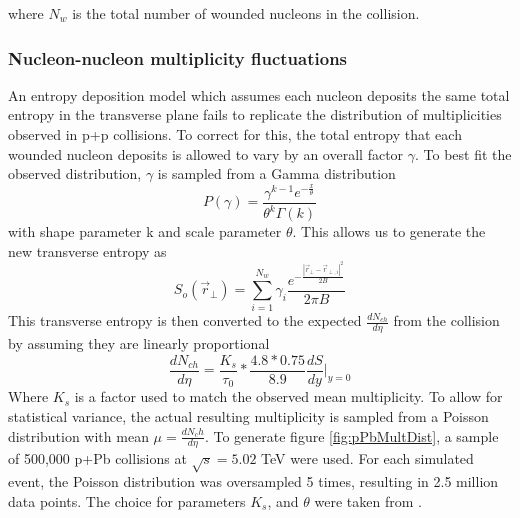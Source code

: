 \documentclass[preprint,showpacs,amsfonts,aps,prl,nofootinbib,floatfix]{revtex4}
\begin{document}
where $N_{w}$ is the total number of wounded nucleons in the collision. 

\subsubsection{Nucleon-nucleon multiplicity fluctuations}
\label{sec2a2}

An entropy deposition model which assumes each nucleon deposits the same total entropy in the transverse plane fails to replicate the distribution of multiplicities observed in p+p collisions. To correct for this, the total entropy that each wounded nucleon deposits is allowed to vary by an overall factor $\gamma$. To best fit the observed distribution, $\gamma$ is sampled from a Gamma distribution
\begin{equation} 
	P(\gamma) = \frac{\gamma^{k-1} e^{-\frac{x}{\theta}}}{\theta^k \Gamma(k)}
\end{equation}
with shape parameter k and scale parameter $\theta$. This allows us to generate the new transverse entropy as
\begin{equation} 
	S_{o}(\vec{r}_{\perp}) = \sum\limits_{i=1}^{N_{w}} \gamma_{i} \frac{e^{-\frac{|\vec{r}_{\perp}-\vec{r}_{\perp,i}|^2}{2B}}}{2\pi B}
\end{equation}
This transverse entropy is then converted to the expected $\frac{dN_{ch}}{d\eta}$ from the collision by assuming they are linearly proportional
\begin{equation}
	\frac{dN_{ch}}{d\eta} = \frac{K_{s}}{\tau_0} * \frac{4.8*0.75}{8.9} \frac{dS}{dy}\biggr\rvert_{y=0} 
\end{equation}
Where $K_s$ is a factor used to match the observed mean multiplicity. To allow for statistical variance, the actual resulting multiplicity is sampled from a Poisson distribution with mean $\mu = \frac{dN_ch}{d\eta}$. To generate figure \ref{fig:pPbMultDist}, a sample of 500,000 p+Pb collisions at $\sqrt{s} = 5.02$ TeV were used. For each simulated event, the Poisson distribution was oversampled 5 times, resulting in 2.5 million data points. The choice for parameters $K_s$, and $\theta$ were taken from \cite{Shen:2014vra}.
\end{document}

